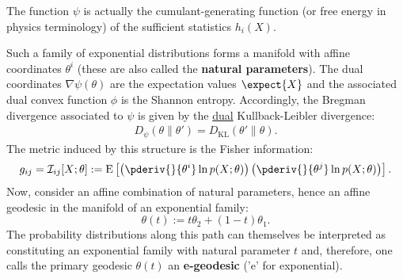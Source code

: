     \begin{remark}
        The function $\psi$ is actually the cumulant-generating function (or free energy in physics terminology) of the sufficient statistics $h_i(X)$.
    \end{remark}

    Such a family of exponential distributions forms a manifold with affine coordinates $\theta^i$ (these are also called the \textbf{natural parameters}). The dual coordinates $\nabla\psi(\theta)$ are the expectation values $\expect{X}$ and the associated dual convex function $\phi$ is the Shannon entropy. Accordingly, the Bregman divergence associated to $\psi$ is given by the \underline{dual} Kullback-Leibler divergence:
    \begin{gather}
        \label{info:KL_reversal}
        D_\psi(\theta\|\theta') = D_\mathrm{KL}(\theta'\|\theta).
    \end{gather}
    The metric induced by this structure is the Fisher information:
    \begin{gather}
        g_{ij} = \mathcal{I}_{ij}[X;\theta] := \text{E}\left[\left(\pderiv{}{\theta^i}\ln p(X;\theta)\right)\left(\pderiv{}{\theta^j}\ln p(X;\theta)\right)\right].
    \end{gather}
    Now, consider an affine combination of natural parameters, hence an affine geodesic in the manifold of an exponential family: \[\theta(t) := t\theta_2 + (1-t)\theta_1.\] The probability distributions along this path can themselves be interpreted as constituting an exponential family with natural parameter $t$ and, therefore, one calls the primary geodesic $\theta(t)$ an \textbf{e-geodesic} ('e' for exponential).

